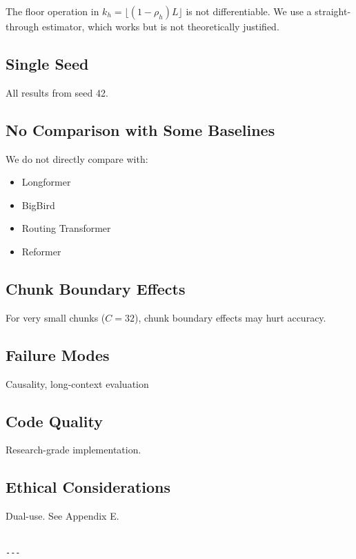 The floor operation in $k_h = \lfloor (1 - \rho_h) L \rfloor$ is not 
differentiable. We use a straight-through estimator, which works but is 
not theoretically justified.

\subsection{Single Seed}

All results from seed 42.

\subsection{No Comparison with Some Baselines}

We do not directly compare with:
\begin{itemize}
\item Longformer
\item BigBird
\item Routing Transformer
\item Reformer

\end{itemize}
\subsection{Chunk Boundary Effects}

For very small chunks ($C = 32$), chunk boundary effects may hurt accuracy.

\subsection{Failure Modes}

Causality, long-context evaluation

\subsection{Code Quality}

Research-grade implementation.

\subsection{Ethical Considerations}

Dual-use. See Appendix E.
\begin{lstlisting}

---
\end{lstlisting}
